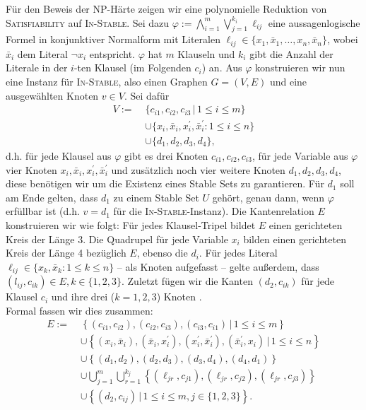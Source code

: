 \documentclass[11pt,a4paper]{article}
\begin{document}
Für den Beweis der \textsf{NP}-Härte zeigen wir eine polynomielle Reduktion von \textsc{Satisfiability} auf \textsc{In-Stable}. Sei dazu \( \varphi := \bigwedge_{i=1}^m \bigvee_{j=1}^{k_i} \ell_{ij} \) eine aussagenlogische Formel in konjunktiver Normalform mit Literalen \( \ell_{ij} \in \lbrace x_1, \bar{x}_1, \ldots, x_n, \bar{x}_n \rbrace \), wobei \( \bar{x}_i \) dem Literal \( \neg x_i \) entspricht. \( \varphi \) hat \( m \) Klauseln und \( k_i \) gibt die Anzahl der Literale in der \( i \)-ten Klausel (im Folgenden \( c_i \)) an.
Aus \( \varphi \) konstruieren wir nun eine Instanz für \textsc{In-Stable}, also einen Graphen \( G = (V, E) \) und eine ausgewählten Knoten \( v \in V \). Sei dafür
\begin{align*}
	V := \;& \lbrace c_{i1}, c_{i2}, c_{i3} \, \big\vert \, 1 \leq i \leq m \rbrace\\
	& \cup \lbrace x_i, \bar{x}_i, x_i^\prime, \bar{x}_i^\prime : 1 \leq i \leq n \rbrace\\
	& \cup \lbrace d_1, d_2, d_3, d_4 \rbrace,
\end{align*}
d.h. für jede Klausel aus \( \varphi \) gibt es drei Knoten \( c_{i1}, c_{i2}, c_{i3} \), für jede Variable aus \( \varphi \) vier Knoten \( x_i, \bar{x}_i, x_i^\prime, \bar{x}_i^\prime \) und zusätzlich noch vier weitere Knoten \( d_1, d_2, d_3, d_4 \), diese benötigen wir um die Existenz eines Stable Sets zu garantieren. Für \( d_1 \) soll am Ende gelten, dass \( d_1 \) zu einem Stable Set \( U \) gehört, genau dann, wenn \( \varphi \) erfüllbar ist ({d.h.} \( v = d_1 \) für die \textsc{In-Stable}-Instanz).
Die Kantenrelation \( E \) konstruieren wir wie folgt: Für jedes Klausel-Tripel bildet \( E \) einen  gerichteten Kreis der Länge 3. Die Quadrupel für jede Variable \( x_i \) bilden einen gerichteten Kreis der Länge 4 bezüglich \( E \), ebenso die \( d_i \). Für jedes Literal \( \ell_{ij} \in \lbrace x_k, \bar{x}_k : 1 \leq k \leq n \rbrace \) -- als Knoten aufgefasst -- gelte außerdem, dass \( (l_{ij}, c_{ik}) \in E, k \in \lbrace 1, 2, 3 \rbrace \). Zuletzt fügen wir die Kanten \( (d_2, c_{ik}) \) für jede Klausel \( c_i \) und ihre drei (\( k = 1,2,3 \)) Knoten .\\
Formal fassen wir dies zusammen:
\begin{align*}
	E := \;& \left\lbrace (c_{i1}, c_{i2}), (c_{i2}, c_{i3}), (c_{i3}, c_{i1}) \, \big\vert \, 1 \leq i \leq m \right\rbrace\\
	& \cup \left\lbrace (x_i, \bar{x}_i), (\bar{x}_i, x_i^\prime), (x_i^\prime, \bar{x}_i^\prime), (\bar{x}_i^\prime, x_i) \, \big\vert \, 1 \leq i \leq n \right\rbrace\\
	& \cup \left\lbrace (d_1, d_2), (d_2, d_3), (d_3, d_4), (d_4, d_1) \right\rbrace\\
	& \cup \bigcup_{j=1}^m \bigcup_{r=1}^{k_j} \left\lbrace (\ell_{jr}, c_{j1}), (\ell_{jr}, c_{j2}), (\ell_{jr}, c_{j3}) \right\rbrace\\
	& \cup \left\lbrace (d_2, c_{ij}) \, \big\vert \, 1 \leq i \leq m, j \in \lbrace 1, 2, 3 \rbrace \right\rbrace.
\end{align*}
\end{document}

